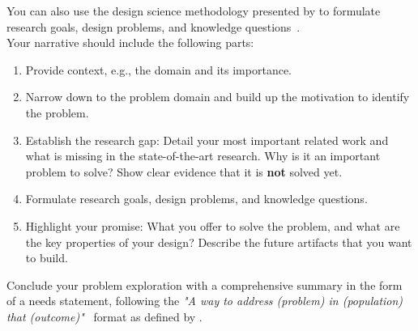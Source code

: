 \documentclass[
	pdftex,
	letterpaper,
	titlepage,
	final,
	oneside,
	11pt,
	DIV=calc,
]{scrbook}
\begin{document}
\begin{tcolorbox}[breakable]
	You can also use the design science methodology presented by \citeauthor{wieringa2014design} to formulate research goals, design problems, and knowledge questions~\cite{wieringa2014design}.
	\\
	Your narrative should include the following parts:
	\begin{enumerate}
		\item Provide context, e.g., the domain and its importance.
		\item Narrow down to the problem domain and build up the motivation to identify the problem.
		\item Establish the research gap: Detail your most important related work and what is missing in the state-of-the-art research. Why is it an important problem to solve? Show clear evidence that it is \textbf{not} solved yet.
		\item Formulate research goals, design problems, and knowledge questions.
		\item Highlight your promise: What you offer to solve the problem, and what are the key properties of your design? Describe the future artifacts that you want to build.
	\end{enumerate}
	Conclude your problem exploration with a comprehensive summary in the form of a needs statement, following the \textit{"A way to address (problem) in (population) that (outcome)"}~\cite{yock2015biodesign} format as defined by \citeauthor{yock2015biodesign}.
\end{tcolorbox}
\end{document}
